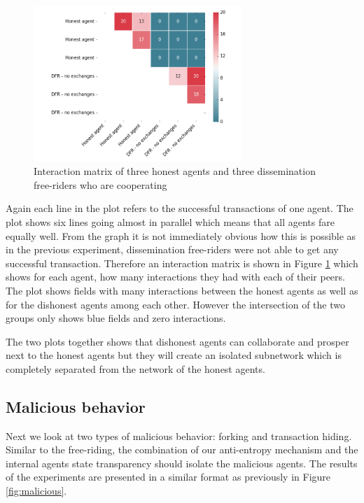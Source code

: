 \begin{figure}[h!]
    \centering
    \includegraphics[width=0.7\textwidth]{images/50percent_interaction_matrix}
    \caption{Interaction matrix of three honest agents and three dissemination free-riders who are cooperating}
    \label{fig:50percent}
\end{figure}

Again each line in the plot refers to the successful transactions of one agent. The plot shows six 
lines going almost in parallel which means that all agents fare equally well. From the graph it 
is not immediately obvious how this is possible as in the previous experiment, dissemination free-riders
were not able to get any successful transaction. Therefore an interaction matrix is shown in Figure 
\ref{fig:50percent} which shows for each agent, how many interactions they had with each of their 
peers. The plot shows fields with many interactions between the honest agents as well as for the 
dishonest agents among each other. However the intersection of the two groups only shows blue fields
and zero interactions. 

The two plots together shows that dishonest agents can collaborate and prosper next to the honest 
agents but they will create an isolated subnetwork which is completely separated from the network 
of the honest agents. 

\subsection{Malicious behavior}
Next we look at two types of malicious behavior: forking and transaction hiding. Similar to the 
free-riding, the combination of our anti-entropy mechanism and the internal agents state transparency 
should isolate the malicious agents. The results of the experiments are presented in a similar 
format as previously in Figure \ref{fig:malicious}.

